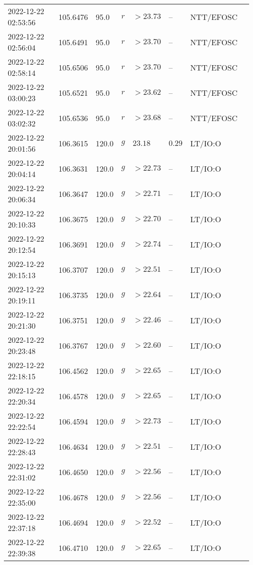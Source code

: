 \documentclass{nature_plusfigure}
\begin{document}
\begin{supplement}
\begin{center}
\begin{longtable}{llllllll}
2022-12-22 02:53:56 & 105.6476 & 95.0 & $r$ & $>23.73$ & -- & NTT/EFOSC &  \\ 
2022-12-22 02:56:04 & 105.6491 & 95.0 & $r$ & $>23.70$ & -- & NTT/EFOSC &  \\ 
2022-12-22 02:58:14 & 105.6506 & 95.0 & $r$ & $>23.70$ & -- & NTT/EFOSC &  \\ 
2022-12-22 03:00:23 & 105.6521 & 95.0 & $r$ & $>23.62$ & -- & NTT/EFOSC &  \\ 
2022-12-22 03:02:32 & 105.6536 & 95.0 & $r$ & $>23.68$ & -- & NTT/EFOSC &  \\ 
2022-12-22 20:01:56 & 106.3615 & 120.0 & $g$ & $23.18$ & $0.29$ & LT/IO:O &  \\ 
2022-12-22 20:04:14 & 106.3631 & 120.0 & $g$ & $>22.73$ & -- & LT/IO:O &  \\ 
2022-12-22 20:06:34 & 106.3647 & 120.0 & $g$ & $>22.71$ & -- & LT/IO:O &  \\ 
2022-12-22 20:10:33 & 106.3675 & 120.0 & $g$ & $>22.70$ & -- & LT/IO:O &  \\ 
2022-12-22 20:12:54 & 106.3691 & 120.0 & $g$ & $>22.74$ & -- & LT/IO:O &  \\ 
2022-12-22 20:15:13 & 106.3707 & 120.0 & $g$ & $>22.51$ & -- & LT/IO:O &  \\ 
2022-12-22 20:19:11 & 106.3735 & 120.0 & $g$ & $>22.64$ & -- & LT/IO:O &  \\ 
2022-12-22 20:21:30 & 106.3751 & 120.0 & $g$ & $>22.46$ & -- & LT/IO:O &  \\ 
2022-12-22 20:23:48 & 106.3767 & 120.0 & $g$ & $>22.60$ & -- & LT/IO:O &  \\ 
2022-12-22 22:18:15 & 106.4562 & 120.0 & $g$ & $>22.65$ & -- & LT/IO:O &  \\ 
2022-12-22 22:20:34 & 106.4578 & 120.0 & $g$ & $>22.65$ & -- & LT/IO:O &  \\ 
2022-12-22 22:22:54 & 106.4594 & 120.0 & $g$ & $>22.73$ & -- & LT/IO:O &  \\ 
2022-12-22 22:28:43 & 106.4634 & 120.0 & $g$ & $>22.51$ & -- & LT/IO:O &  \\ 
2022-12-22 22:31:02 & 106.4650 & 120.0 & $g$ & $>22.56$ & -- & LT/IO:O &  \\ 
2022-12-22 22:35:00 & 106.4678 & 120.0 & $g$ & $>22.56$ & -- & LT/IO:O &  \\ 
2022-12-22 22:37:18 & 106.4694 & 120.0 & $g$ & $>22.52$ & -- & LT/IO:O &  \\ 
2022-12-22 22:39:38 & 106.4710 & 120.0 & $g$ & $>22.65$ & -- & LT/IO:O &  \\ 

\end{longtable}
\end{center}
\end{supplement}
\end{document}
